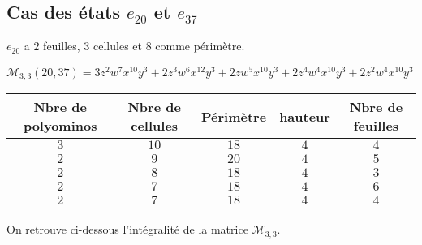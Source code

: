 \subsection*{Cas des états $e_{20}$ et $e_{37}$ }
$e_{20}$ a $2$ feuilles, $3$ cellules et $8$ comme périmètre.

$\mathcal{M}_{3,3}(20,37)=3z^2w^7x^{10}y^3+2z^3w^6x^{12}y^3+2zw^5x^{10}y^3+2z^4w^4x^{10}y^3+2z^2w^4x^{10}y^3$\\
\begin{tabular}{|c|c|c|c|c|}
 \hline
  Nbre de polyominos & Nbre de cellules & Périmètre & hauteur &Nbre de feuilles\\
 \hline
 $3$ & $10$ & $18$ & $4$ &$4$\\
 \hline
 $2$ & $9$ & $20$ & $4$ &$5$\\
 \hline
 $2$ & $8$ & $18$ & $4$ &$3$\\
 \hline
 $2$ & $7$ & $18$ & $4$ &$6$\\
 \hline
 $2$ & $7$ & $18$ & $4$ &$4$\\
 \hline
\end{tabular}

On retrouve ci-dessous l'intégralité de la matrice $\mathcal{M}_{3,3}$.

